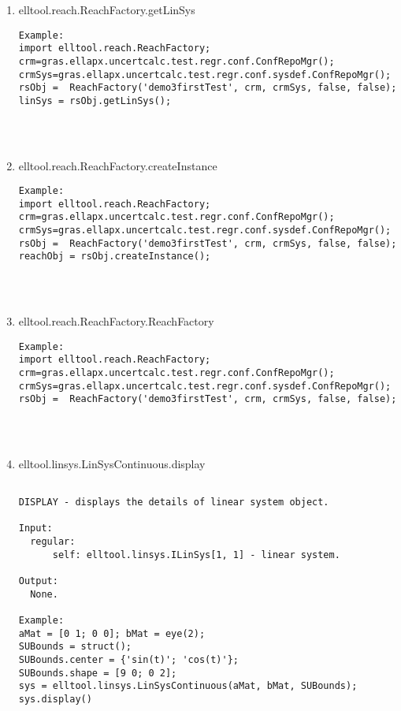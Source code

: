 \begin{enumerate}
\begin{lstlisting}
\end{lstlisting}
\fontfamily{\familydefault}
\selectfont
\item {elltool.reach.ReachFactory.getLinSys}
\selectfont
\begin{lstlisting}
Example:
import elltool.reach.ReachFactory;
crm=gras.ellapx.uncertcalc.test.regr.conf.ConfRepoMgr();
crmSys=gras.ellapx.uncertcalc.test.regr.conf.sysdef.ConfRepoMgr();
rsObj =  ReachFactory('demo3firstTest', crm, crmSys, false, false);
linSys = rsObj.getLinSys();




\end{lstlisting}
\fontfamily{\familydefault}
\selectfont
\item {elltool.reach.ReachFactory.createInstance}
\selectfont
\begin{lstlisting}
Example:
import elltool.reach.ReachFactory;
crm=gras.ellapx.uncertcalc.test.regr.conf.ConfRepoMgr();
crmSys=gras.ellapx.uncertcalc.test.regr.conf.sysdef.ConfRepoMgr();
rsObj =  ReachFactory('demo3firstTest', crm, crmSys, false, false);
reachObj = rsObj.createInstance();




\end{lstlisting}
\fontfamily{\familydefault}
\selectfont
\item {elltool.reach.ReachFactory.ReachFactory}
\selectfont
\begin{lstlisting}
Example:
import elltool.reach.ReachFactory;
crm=gras.ellapx.uncertcalc.test.regr.conf.ConfRepoMgr();
crmSys=gras.ellapx.uncertcalc.test.regr.conf.sysdef.ConfRepoMgr();
rsObj =  ReachFactory('demo3firstTest', crm, crmSys, false, false);




\end{lstlisting}
\fontfamily{\familydefault}
\selectfont
\item {elltool.linsys.LinSysContinuous.display}
\selectfont
\begin{lstlisting}

DISPLAY - displays the details of linear system object.

Input:
  regular:
      self: elltool.linsys.ILinSys[1, 1] - linear system.

Output:
  None.

Example:
aMat = [0 1; 0 0]; bMat = eye(2);
SUBounds = struct();
SUBounds.center = {'sin(t)'; 'cos(t)'};
SUBounds.shape = [9 0; 0 2];
sys = elltool.linsys.LinSysContinuous(aMat, bMat, SUBounds);
sys.display()






\end{lstlisting}
\end{enumerate}
